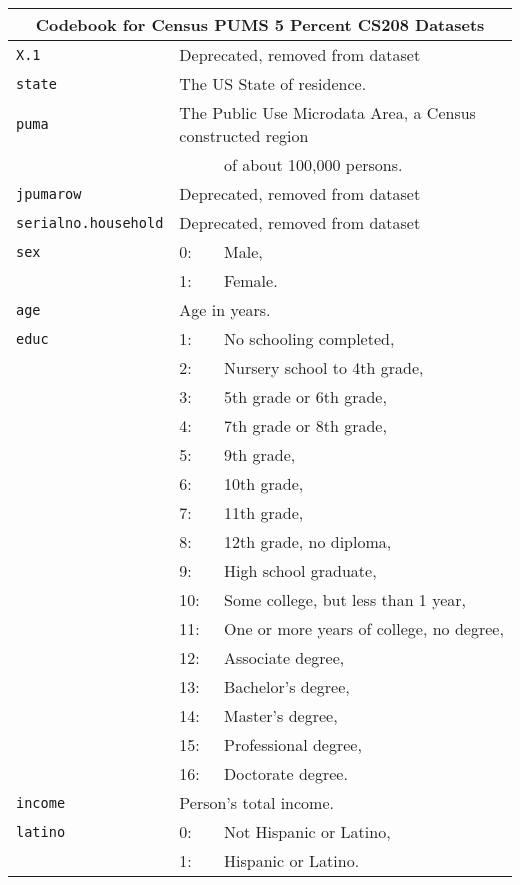 \documentclass[11pt]{article}
\begin{document}
\newpage
\vspace{-1cm}
\begin{tabular}{lll}
\multicolumn{3}{c}{\textbf{Codebook for Census PUMS 5 Percent CS208 Datasets}}\\
\hline
\texttt{X.1} &\multicolumn{2}{l}{Deprecated, removed from dataset}\\
\texttt{state} &\multicolumn{2}{l}{The US State of residence.}\\
\texttt{puma} &\multicolumn{2}{l}{The Public Use Microdata Area, a Census constructed region}\\ 
&& of about 100,000 persons.\\
\texttt{jpumarow} &\multicolumn{2}{l}{Deprecated, removed from dataset}\\
\texttt{serialno.household} &\multicolumn{2}{l}{Deprecated, removed from dataset}\\
\texttt{sex} & 0: &Male, \\
            &    1: &Female.\\
\texttt{age} &\multicolumn{2}{l}{Age in years.}\\
\texttt{educ} & 1:&     No schooling completed,\\
&2:&        Nursery school to 4th grade,\\
&3:&        5th grade or 6th grade,\\
&4:&        7th grade or 8th grade,\\
&5:&        9th grade,\\
&6:&        10th grade,\\
&7:&        11th grade,\\
&8:&        12th grade, no diploma,\\
&9:&        High school graduate,\\
&10:&       Some college, but less than 1 year,\\
&11:&       One or more years of college, no degree,\\
&12:&       Associate degree,\\
&13:&       Bachelor's degree,\\
&14:&       Master's degree,\\
&15:&       Professional degree,\\
&16:&       Doctorate degree.\\
\texttt{income} &\multicolumn{2}{l}{Person's total income.} \\
\texttt{latino} & 0: & Not Hispanic or Latino,\\
                & 1: & Hispanic or Latino.\\

\end{tabular}
\end{document}
